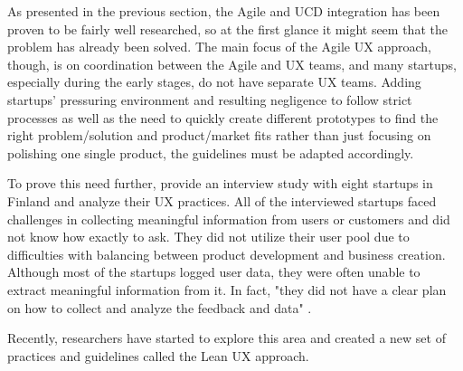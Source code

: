 \documentclass{article}
\begin{document}
As presented in the previous section, the Agile and UCD integration has been proven to be fairly well researched, so at the first glance it might seem that the problem has already been solved. The main focus of the Agile UX approach, though, is on coordination between the Agile and UX teams, and many startups, especially during the early stages, do not have separate UX teams. Adding startups' pressuring environment and resulting negligence to follow strict processes as well as the need to quickly create different prototypes to find the right problem/solution and product/market fits rather than just focusing on polishing one single product, the guidelines must be adapted accordingly.

To prove this need further, \cite{hokkanen2015ux} provide an interview study with eight startups in Finland and analyze their UX practices. All of the interviewed startups faced challenges in collecting meaningful information from users or customers and did not know how exactly to ask. They did not utilize their user pool due to difficulties with balancing between product development and business creation. Although most of the startups logged user data, they were often unable to extract meaningful information from it. In fact, "they did not have a clear plan on how to collect and analyze the feedback and data" \citep[89]{hokkanen2015ux}.

Recently, researchers have started to explore this area and created a new set of practices and guidelines called the Lean UX approach.
\end{document}
